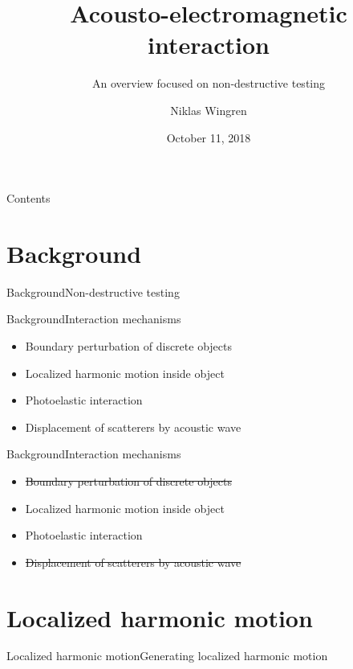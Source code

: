 \documentclass[11pt]{beamer}
\begin{document}
	\author{Niklas Wingren}
	\title{Acousto-electromagnetic interaction}
	\subtitle{An overview focused on non-destructive testing}
	\date{October 11, 2018}
	\frame[plain]{\maketitle}
	
	\begin{frame}{Contents}
		\tableofcontents
	\end{frame}
	
	\section{Background}
	\begin{frame}{Background}{Non-destructive testing}
		
	\end{frame}
	
	\begin{frame}{Background}{Interaction mechanisms}
		\begin{itemize}
			\item Boundary perturbation of discrete objects
			\item Localized harmonic motion inside object
			\item Photoelastic interaction
			\item Displacement of scatterers by acoustic wave
		\end{itemize}
	\end{frame}
	
	\begin{frame}{Background}{Interaction mechanisms}
		\begin{itemize}
			\item \sout{Boundary perturbation of discrete objects}
			\item Localized harmonic motion inside object
			\item Photoelastic interaction
			\item \sout{Displacement of scatterers by acoustic wave}
		\end{itemize}
	\end{frame}
	
	\section{Localized harmonic motion}
	\begin{frame}{Localized harmonic motion}{Generating localized harmonic motion}
		
	\end{frame}
	
\end{document}
